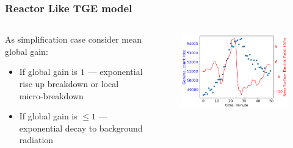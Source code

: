 \documentclass[8pt,pdf,hyperref={unicode}]{beamer}
\begin{document}
\usebackgroundtemplate{}
\begin{frame}
\frametitle{Reactor Like TGE model}
\begin{columns}
    \begin{column}{0.5\textwidth}
{\large         As simplification case consider mean global gain:
        \begin{itemize}
            \item  If global gain is $\large 1$ --- exponential rise up breakdown or local micro-breakdown
            \item If global gain is $\le 1$ --- exponential decay to background radiation
        \end{itemize}}
    \end{column}
    \begin{column}{0.5\textwidth}
        \begin{figure}[htb]
            \centering
            \includegraphics[width=1\columnwidth]{aragats.png}
            \\
        \end{figure}
        
    \end{column}
\end{columns}

\end{frame}
\end{document}
